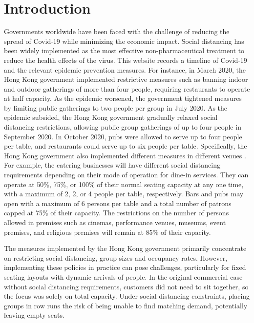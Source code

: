 \section{Introduction}
Governments worldwide have been faced with the challenge of reducing the spread of Covid-19 while minimizing the economic impact. Social distancing has been widely implemented as the most effective non-pharmaceutical treatment to reduce the health effects of the virus. 
This website records a timeline of Covid-19 and the relevant epidemic prevention measures\cite{Covid19Timeline}. For instance, in March 2020, the Hong Kong government implemented restrictive measures such as banning indoor and outdoor gatherings of more than four people, requiring restaurants to operate at half capacity. As the epidemic worsened, the government tightened measures by limiting public gatherings to two people per group in July 2020. As the epidemic subsided, the Hong Kong government gradually relaxed social distancing restrictions, allowing public group gatherings of up to four people in September 2020. In October 2020, pubs were allowed to serve up to four people per table, and restaurants could serve up to six people per table. Specifically, the Hong Kong government also implemented different measures in different venues \cite{Gov202209}. For example, the catering businesses will have different social distancing requirements depending on their mode of operation for dine-in services. They can operate at 50\%, 75\%, or 100\% of their normal seating capacity at any one time, with a maximum of 2, 2, or 4 people per table, respectively. Bars and pubs may open with a maximum of 6 persons per table and a total number of patrons capped at 75\% of their capacity. The restrictions on the number of persons allowed in premises such as cinemas, performance venues, museums, event premises, and religious premises will remain at 85\% of their capacity.


The measures implemented by the Hong Kong government primarily concentrate on restricting social distancing, group sizes and occupancy rates. However, implementing these policies in practice can pose challenges, particularly for fixed seating layouts with dynamic arrivals of people. In the original commercial case without social distancing requirements, customers did not need to sit together, so the focus was solely on total capacity. Under social distancing constraints, placing groups in row runs the risk of being unable to find matching demand, potentially leaving empty seats.

